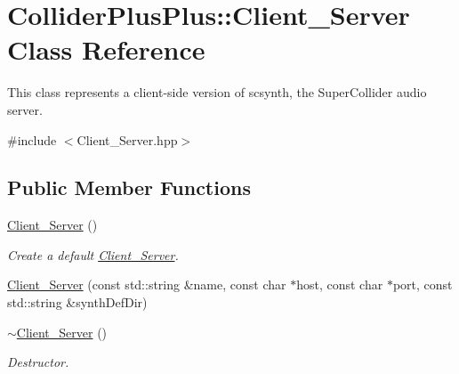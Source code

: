 \hypertarget{classColliderPlusPlus_1_1Client__Server}{\section{Collider\-Plus\-Plus\-:\-:Client\-\_\-\-Server Class Reference}
\label{classColliderPlusPlus_1_1Client__Server}
}


This class represents a client-\/side version of scsynth, the Super\-Collider audio server.  




{\ttfamily \#include $<$Client\-\_\-\-Server.\-hpp$>$}

\subsection*{Public Member Functions}
\begin{DoxyCompactItemize}
\item 
\hypertarget{classColliderPlusPlus_1_1Client__Server_aa179711b3f9a10b86e95bf99bdc2718c}{\hyperlink{classColliderPlusPlus_1_1Client__Server_aa179711b3f9a10b86e95bf99bdc2718c}{Client\-\_\-\-Server} ()}\label{classColliderPlusPlus_1_1Client__Server_aa179711b3f9a10b86e95bf99bdc2718c}

\begin{DoxyCompactList}\small\item\em Create a default \hyperlink{classColliderPlusPlus_1_1Client__Server}{Client\-\_\-\-Server}. \end{DoxyCompactList}\item 
\hyperlink{classColliderPlusPlus_1_1Client__Server_a04d0177e0c05ab03825c9820fedea3d7}{Client\-\_\-\-Server} (const std\-::string \&name, const char $\ast$host, const char $\ast$port, const std\-::string \&synth\-Def\-Dir)
\item 
\hypertarget{classColliderPlusPlus_1_1Client__Server_a462cbd7e74b2c5f5073865e29d528505}{\hyperlink{classColliderPlusPlus_1_1Client__Server_a462cbd7e74b2c5f5073865e29d528505}{$\sim$\-Client\-\_\-\-Server} ()}\label{classColliderPlusPlus_1_1Client__Server_a462cbd7e74b2c5f5073865e29d528505}

\begin{DoxyCompactList}\small\item\em Destructor. \end{DoxyCompactList}\end{DoxyCompactItemize}
